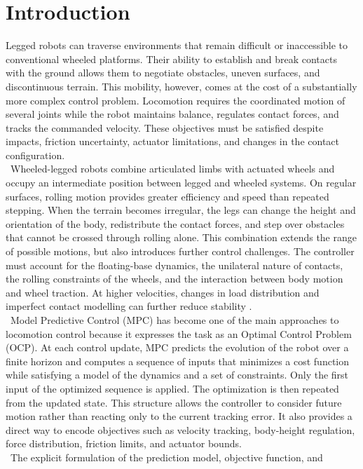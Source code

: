 \chapter{Introduction}
Legged robots can traverse environments that remain difficult or inaccessible to
conventional wheeled platforms. Their ability to establish and break contacts
with the ground allows them to negotiate obstacles, uneven surfaces, and
discontinuous terrain. This mobility, however, comes at the cost of a
substantially more complex control problem. Locomotion requires the coordinated
motion of several joints while the robot maintains balance, regulates contact
forces, and tracks the commanded velocity. These objectives must be satisfied
despite impacts, friction uncertainty, actuator limitations, and changes in the
contact configuration.\\
\
Wheeled-legged robots combine articulated limbs with actuated wheels and occupy
an intermediate position between legged and wheeled systems. On regular
surfaces, rolling motion provides greater efficiency and speed than repeated
stepping. When the terrain becomes irregular, the legs can change the height
and orientation of the body, redistribute the contact forces, and step over
obstacles that cannot be crossed through rolling alone. This combination
extends the range of possible motions, but also introduces further control
challenges. The controller must account for the floating-base dynamics, the
unilateral nature of contacts, the rolling constraints of the wheels, and the
interaction between body motion and wheel traction. At higher velocities,
changes in load distribution and imperfect contact modelling can further
reduce stability \cite{racing}.\\
\
Model Predictive Control (MPC) has become one of the main approaches to locomotion
control because it expresses the task as an Optimal Control Problem (OCP). At each
control update, MPC predicts the evolution of the robot over a finite horizon
and computes a sequence of inputs that minimizes a cost function while
satisfying a model of the dynamics and a set of constraints. Only the first
input of the optimized sequence is applied. The optimization is then repeated
from the updated state. This structure allows the controller to consider future
motion rather than reacting only to the current tracking error. It also provides
a direct way to encode objectives such as velocity tracking, body-height regulation, force
distribution, friction limits, and actuator bounds.\\
\
The explicit formulation of the prediction model, objective function, and
